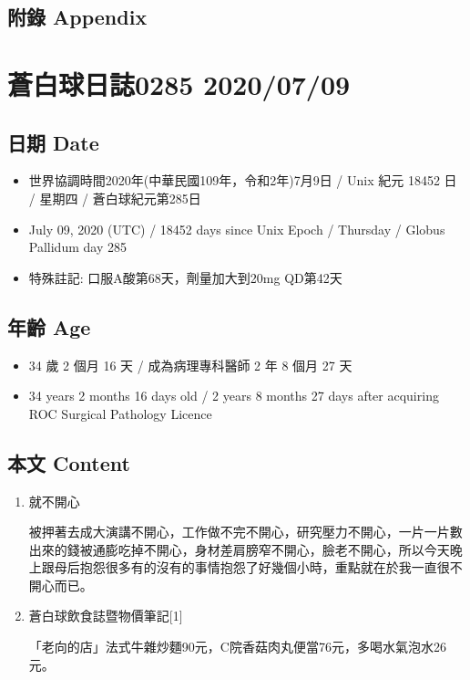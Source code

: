 \documentclass[
]{article}
\providecommand{\tightlist}{%
  \setlength{\itemsep}{0pt}\setlength{\parskip}{0pt}}
\begin{document}
\hypertarget{ux9644ux9304-appendix-7}{%
\subsection{附錄 Appendix}\label{ux9644ux9304-appendix-7}}

\hypertarget{ux84bcux767dux7403ux65e5ux8a8c0285-20200709}{%
\section{蒼白球日誌0285
2020/07/09}\label{ux84bcux767dux7403ux65e5ux8a8c0285-20200709}}

\hypertarget{ux65e5ux671f-date-8}{%
\subsection{日期 Date}\label{ux65e5ux671f-date-8}}

\begin{itemize}
\tightlist
\item
  世界協調時間2020年(中華民國109年，令和2年)7月9日 / Unix 紀元 18452 日
  / 星期四 / 蒼白球紀元第285日
\item
  July 09, 2020 (UTC) / 18452 days since Unix Epoch / Thursday / Globus
  Pallidum day 285
\item
  特殊註記: 口服A酸第68天，劑量加大到20mg QD第42天
\end{itemize}

\hypertarget{ux5e74ux9f61-age-8}{%
\subsection{年齡 Age}\label{ux5e74ux9f61-age-8}}

\begin{itemize}
\tightlist
\item
  34 歲 2 個月 16 天 / 成為病理專科醫師 2 年 8 個月 27 天
\item
  34 years 2 months 16 days old / 2 years 8 months 27 days after
  acquiring ROC Surgical Pathology Licence
\end{itemize}

\hypertarget{ux672cux6587-content-8}{%
\subsection{本文 Content}\label{ux672cux6587-content-8}}

\begin{enumerate}
\def\labelenumi{\arabic{enumi}.}
\item
  就不開心

  被押著去成大演講不開心，工作做不完不開心，研究壓力不開心，一片一片數出來的錢被通膨吃掉不開心，身材差肩膀窄不開心，臉老不開心，所以今天晚上跟母后抱怨很多有的沒有的事情抱怨了好幾個小時，重點就在於我一直很不開心而已。
\item
  蒼白球飲食誌暨物價筆記{[}1{]}

  「老向的店」法式牛雜炒麵90元，C院香菇肉丸便當76元，多喝水氣泡水26元。
\end{enumerate}
\end{document}
